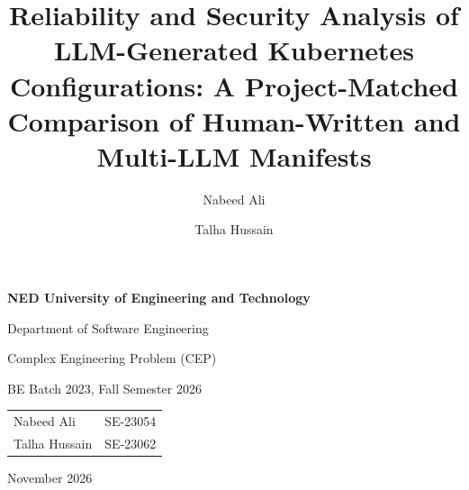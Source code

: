 \documentclass[a4paper,fleqn]{cas-dc}
\begin{document}
\let\WriteBookmarks\relax
\def\floatpagepagefraction{1}
\def\textpagefraction{.001}


\begin{titlepage}
\centering\large
{\Large\bfseries NED University of Engineering and Technology\par}
\vspace{2mm}Department of Software Engineering\par
\vspace{18mm}{\bfseries SE-490 Cloud Computing\par}
\vspace{2mm}Complex Engineering Problem (CEP)\par
\vspace{2mm}BE Batch 2023, Fall Semester 2026\par
\vspace{22mm}{\LARGE\bfseries Reliability and Security Analysis of LLM-Generated Kubernetes Configurations\par}
\vspace{4mm}{\large A Project-Matched Comparison of Human-Written and Multi-LLM Manifests\par}
\vspace{25mm}{\bfseries Group members\par}\vspace{3mm}
\begin{tabular}{ll}
Nabeed Ali & SE-23054 \\
Talha Hussain & SE-23062 \\
\end{tabular}\par
\vfill November 2026\par
\end{titlepage}
\setcounter{page}{1}


\title[mode = title]{Reliability and Security Analysis of LLM-Generated Kubernetes Configurations: A Project-Matched Comparison of Human-Written and Multi-LLM Manifests}

\author[1]{Nabeed Ali}
\author[1]{Talha Hussain}

\end{document}
